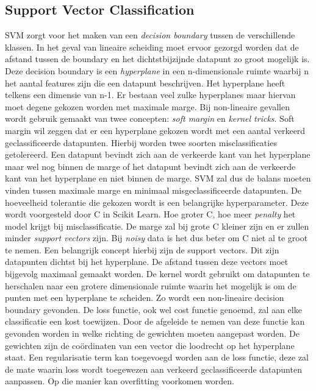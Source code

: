\subsection{Support Vector Classification}
SVM zorgt voor het maken van een \textit{decision boundary} tussen de verschillende klassen.
In het geval van lineaire scheiding moet ervoor gezorgd worden dat de afstand tussen de boundary en het dichtstbijzijnde datapunt zo groot mogelijk is. Deze decision boundary is een \textit{hyperplane} in een n-dimensionale ruimte waarbij n het aantal features zijn die een datapunt beschrijven. Het hyperplane heeft telkens een dimensie van n-1. Er bestaan veel zulke hyperplanes maar hiervan moet degene gekozen worden met maximale marge.
Bij non-lineaire gevallen wordt gebruik gemaakt van twee concepten: \textit{soft margin} en \textit{kernel tricks}. 
Soft margin wil zeggen dat er een hyperplane gekozen wordt met een aantal verkeerd geclassificeerde datapunten. Hierbij worden twee soorten misclassificaties getolereerd. Een datapunt bevindt zich aan de verkeerde kant van het hyperplane maar wel nog binnen de marge of het datapunt bevindt zich aan de verkeerde kant van het hyperplane en niet binnen de marge. SVM zal dus de balans moeten vinden tussen maximale marge en minimaal misgeclassificeerde datapunten. De hoeveelheid tolerantie die gekozen wordt is een belangrijke hyperparameter. Deze wordt voorgesteld door C in Scikit Learn. Hoe groter C, hoe meer \textit{penalty} het model krijgt bij misclassificatie. De marge zal bij grote C kleiner zijn en er zullen minder \textit{support vectors} zijn. Bij \textit{noisy} data is het dus beter om C niet al te groot te nemen.
Een belangrijk concept hierbij zijn de support vectors. Dit zijn datapunten dichtst bij het hyperplane. De afstand tussen deze vectors moet bijgevolg maximaal gemaakt worden.
De kernel wordt gebruikt om datapunten te herschalen naar een grotere dimensionale ruimte waarin het mogelijk is om de punten met een hyperplane te scheiden. Zo wordt een non-lineaire decision boundary gevonden.
De loss functie, ook wel cost functie genoemd, zal aan elke classificatie een kost toewijzen. 
Door de afgeleide te nemen van deze functie kan gevonden worden in welke richting de gewichten moeten aangepast worden. De gewichten zijn de coördinaten van een vector die loodrecht op het hyperplane staat.
Een regularisatie term kan toegevoegd worden aan de loss functie, deze zal de mate waarin loss wordt toegewezen aan verkeerd geclassificeerde datapunten aanpassen. Op die manier kan overfitting voorkomen worden.

